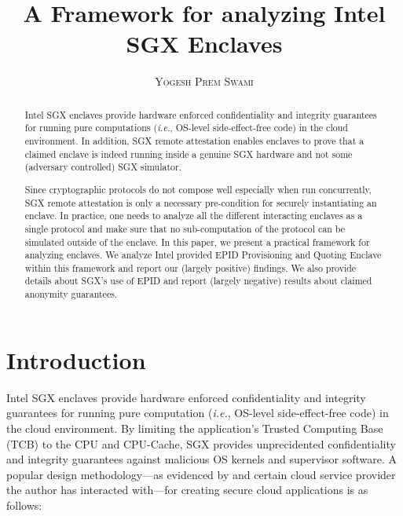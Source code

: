 \documentclass[11pt]{article}
\title{\bf A Framework for analyzing Intel SGX Enclaves}
\author{\textsc{Yogesh Prem Swami}}
\date{\lastupdate}
\newcommand{\ie}{\textit{i.e.}}
\begin{document}

\maketitle

\begin{abstract}
  Intel SGX enclaves  provide hardware
  enforced confidentiality and integrity guarantees for running pure
  computations (\ie, OS-level side-effect-free code) in the cloud
  environment. In addition, SGX remote attestation enables
  enclaves to prove that a claimed enclave is indeed running inside a
  genuine SGX hardware and not some (adversary controlled) SGX
  simulator.


  Since cryptographic protocols do not compose well \cite{ucframework} 
  especially when run concurrently, SGX remote attestation is only a 
  necessary pre-condition for securely instantiating an enclave. In 
  practice, one needs to analyze all the different interacting enclaves 
  as a single protocol and make sure that no sub-computation of the 
  protocol can be simulated outside of the enclave. In this paper, 
  we present a practical framework for analyzing enclaves. We analyze 
  Intel provided EPID\cite{epid} \textsf{Provisioning} and \textsf{Quoting} 
  Enclave\cite{sgxattest} within this framework and report our (largely 
  positive) findings. We also provide details about SGX's use of EPID 
  and report (largely negative) results about claimed anonymity guarantees.
  
\end{abstract}

\section{Introduction}
\label{sec:intro}
  Intel SGX enclaves\cite{sgxinnov, sgxinnov2} provide hardware
  enforced confidentiality and  integrity guarantees for running pure
  computation (\textit{i.e.}, OS-level side-effect-free code) in the
  cloud environment. By limiting the application's Trusted Computing
  Base (TCB) to the CPU and CPU-Cache, SGX provides unprecidented
  confidentiality and integrity guarantees against malicious OS
  kernels and supervisor software. A popular design 
  methodology---as evidenced by \cite{Haven, Graphene, Scone} and certain
  cloud service provider the author has interacted with---for creating 
  secure cloud applications is as follows:
\end{document}
